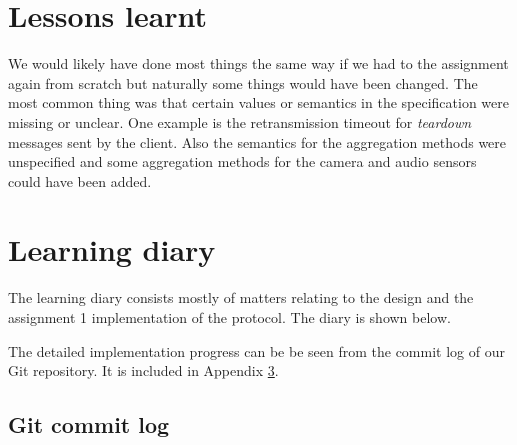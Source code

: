 \documentclass[a4paper]{article}
\begin{document}
\section{Lessons learnt}
We would likely have done most things the same way if we had to the assignment
again from scratch but naturally some things would have been changed. The most
common thing was that certain values or semantics in the specification were
missing or unclear. One example is the retransmission timeout for \emph{teardown}
messages sent by the client. Also the semantics for the aggregation methods
were unspecified and some aggregation methods for the camera and audio sensors
could have been added. 


\section{Learning diary}
The learning diary consists mostly of matters relating to the design and the
assignment 1 implementation of the protocol. The diary is shown below.

The detailed implementation progress can be be seen from the commit log of our
Git repository. It is included in Appendix \ref{lst:commit_log}.



\clearpage
\begin{appendices}
  \section{Git commit log}\label{lst:commit_log}
  
\end{appendices}
\end{document}
